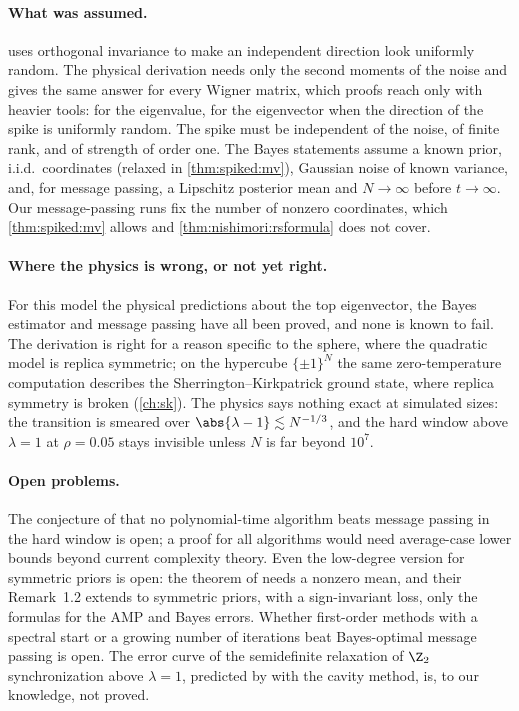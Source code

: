 \begin{refsection}
\paragraph{What was assumed.}  uses orthogonal invariance to make an independent direction look uniformly random. The physical derivation needs only the second moments of the noise and gives the same answer for every Wigner matrix, which proofs reach only with heavier tools: \textcite{CapitaineDonatiMartinFeral2009} for the eigenvalue, \textcite{BenaychGeorgesNadakuditi2011} for the eigenvector when the direction of the spike is uniformly random. The spike must be independent of the noise, of finite rank, and of strength of order one. The Bayes statements assume a known prior, i.i.d.\ coordinates (relaxed in \cref{thm:spiked:mv}), Gaussian noise of known variance, and, for message passing, a Lipschitz posterior mean and $N\to\infty$ before $t\to\infty$. Our message-passing runs fix the number of nonzero coordinates, which \cref{thm:spiked:mv} allows and \cref{thm:nishimori:rsformula} does not cover.

\paragraph{Where the physics is wrong, or not yet right.} For this model the physical predictions about the top eigenvector, the Bayes estimator and message passing have all been proved, and none is known to fail. The derivation is right for a reason specific to the sphere, where the quadratic model is replica symmetric; on the hypercube $\{\pm1\}^N$ the same zero-temperature computation describes the Sherrington--Kirkpatrick ground state, where replica symmetry is broken (\cref{ch:sk}). The physics says nothing exact at simulated sizes: the transition is smeared over $\abs{\lambda-1}\lesssim N^{-1/3}$, and the hard window above $\lambda=1$ at $\rho=0.05$ stays invisible unless $N$ is far beyond $10^7$.

\paragraph{Open problems.} The conjecture of \textcite{LesieurKrzakalaZdeborova2017} that no polynomial-time algorithm beats message passing in the hard window is open; a proof for all algorithms would need average-case lower bounds beyond current complexity theory. Even the low-degree version for symmetric priors is open: the theorem of \textcite{MontanariWein2025} needs a nonzero mean, and their Remark~1.2 extends to symmetric priors, with a sign-invariant loss, only the formulas for the AMP and Bayes errors. Whether first-order methods with a spectral start or a growing number of iterations beat Bayes-optimal message passing is open. The error curve of the semidefinite relaxation of $\Z_2$ synchronization above $\lambda=1$, predicted by \textcite{JavanmardMontanariRicciTersenghi2016} with the cavity method, is, to our knowledge, not proved.


\end{refsection}
